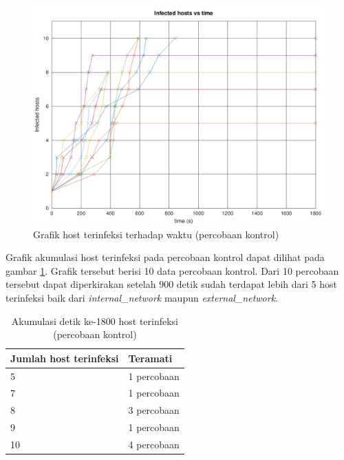 \begin{figure}[H]
	\centering
	\includegraphics[width=\textwidth]{resources/infection_control_over_time.png}
	\caption{Grafik host terinfeksi terhadap waktu (percobaan kontrol)}
	\label{fig:infection_control_over_time}
\end{figure}

Grafik akumulasi host terinfeksi pada percobaan kontrol dapat dilihat pada gambar \ref{fig:infection_control_over_time}. Grafik tersebut berisi 10 data percobaan kontrol. Dari 10 percobaan tersebut dapat diperkirakan setelah 900 detik sudah terdapat lebih dari 5 host terinfeksi baik dari \textit{internal\_network} maupun \textit{external\_network}.

\begin{table}[H]
	\caption{Akumulasi detik ke-1800 host terinfeksi (percobaan kontrol)}
	\label{table:1800s_all_network_control}
	\begin{center}
		\begin{tabularx}{300px}{|X|r|}
			\hline
			\multicolumn{1}{|l}{\textbf{Jumlah host terinfeksi}} & \multicolumn{1}{|l|}{\textbf{Teramati}} \\ \hline
			5 & 1 percobaan\\ \hline
			7 & 1 percobaan\\ \hline
			8 & 3 percobaan\\ \hline
			9 & 1 percobaan\\ \hline
			10 & 4 percobaan\\ \hline
		\end{tabularx}
	\end{center}
\end{table}

